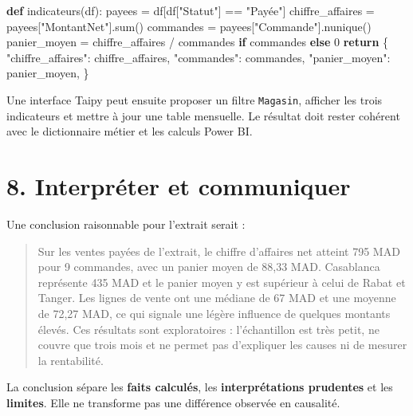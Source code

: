 \documentclass[
  french,
  letterpaper,
  open=any]{scrbook}
\newenvironment{Shaded}{\begin{snugshade}}{\end{snugshade}}
\newcommand{\BuiltInTok}[1]{\textcolor[rgb]{0.00,0.23,0.31}{#1}}
\newcommand{\ControlFlowTok}[1]{\textcolor[rgb]{0.00,0.23,0.31}{\textbf{#1}}}
\newcommand{\DecValTok}[1]{\textcolor[rgb]{0.68,0.00,0.00}{#1}}
\newcommand{\KeywordTok}[1]{\textcolor[rgb]{0.00,0.23,0.31}{\textbf{#1}}}
\newcommand{\NormalTok}[1]{\textcolor[rgb]{0.00,0.23,0.31}{#1}}
\newcommand{\OperatorTok}[1]{\textcolor[rgb]{0.37,0.37,0.37}{#1}}
\newcommand{\StringTok}[1]{\textcolor[rgb]{0.13,0.47,0.30}{#1}}
\theoremstyle{definition}
\theoremstyle{definition}
\theoremstyle{remark}
\begin{document}
\begin{Shaded}
\begin{Highlighting}[]
\KeywordTok{def}\NormalTok{ indicateurs(df):}
\NormalTok{    payees }\OperatorTok{=}\NormalTok{ df[df[}\StringTok{"Statut"}\NormalTok{] }\OperatorTok{==} \StringTok{"Payée"}\NormalTok{]}
\NormalTok{    chiffre\_affaires }\OperatorTok{=}\NormalTok{ payees[}\StringTok{"MontantNet"}\NormalTok{].}\BuiltInTok{sum}\NormalTok{()}
\NormalTok{    commandes }\OperatorTok{=}\NormalTok{ payees[}\StringTok{"Commande"}\NormalTok{].nunique()}
\NormalTok{    panier\_moyen }\OperatorTok{=}\NormalTok{ chiffre\_affaires }\OperatorTok{/}\NormalTok{ commandes }\ControlFlowTok{if}\NormalTok{ commandes }\ControlFlowTok{else} \DecValTok{0}
    \ControlFlowTok{return}\NormalTok{ \{}
        \StringTok{"chiffre\_affaires"}\NormalTok{: chiffre\_affaires,}
        \StringTok{"commandes"}\NormalTok{: commandes,}
        \StringTok{"panier\_moyen"}\NormalTok{: panier\_moyen,}
\NormalTok{    \}}
\end{Highlighting}
\end{Shaded}

Une interface Taipy peut ensuite proposer un filtre \texttt{Magasin},
afficher les trois indicateurs et mettre à jour une table mensuelle. Le
résultat doit rester cohérent avec le dictionnaire métier et les calculs
Power BI.

\section{8. Interpréter et
communiquer}\label{interpruxe9ter-et-communiquer}

Une conclusion raisonnable pour l'extrait serait :

\begin{quote}
Sur les ventes payées de l'extrait, le chiffre d'affaires net atteint
795 MAD pour 9 commandes, avec un panier moyen de 88,33 MAD. Casablanca
représente 435 MAD et le panier moyen y est supérieur à celui de Rabat
et Tanger. Les lignes de vente ont une médiane de 67 MAD et une moyenne
de 72,27 MAD, ce qui signale une légère influence de quelques montants
élevés. Ces résultats sont exploratoires : l'échantillon est très petit,
ne couvre que trois mois et ne permet pas d'expliquer les causes ni de
mesurer la rentabilité.
\end{quote}

La conclusion sépare les \textbf{faits calculés}, les
\textbf{interprétations prudentes} et les \textbf{limites}. Elle ne
transforme pas une différence observée en causalité.
\end{document}
